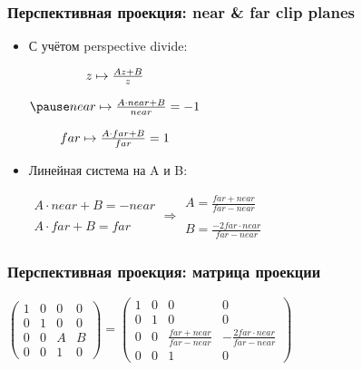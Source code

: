 \documentclass[10pt]{beamer}
\begin{document}
\begin{frame}[fragile]
\frametitle{Перспективная проекция: near \& far clip planes}
\begin{itemize}
\item С учётом perspective divide:
\begin{center}
\begin{math}
\begin{matrix}
z \mapsto \frac{Az + B}{z} \\ \\
\pause
near \mapsto \frac{A\cdot near + B}{near} = -1 \\ \\
far \mapsto \frac{A\cdot far + B}{far} = 1
\end{matrix}
\end{math}
\end{center}
\pause
\item Линейная система на A и B:
\begin{center}
\begin{math}
\begin{matrix}
A \cdot near + B = -near \\ \\
A \cdot far + B = far
\end{matrix}
\Rightarrow
\begin{matrix}
A = \frac{far + near}{far - near} \\ \\
B = \frac{-2 far \cdot near}{far - near}
\end{matrix}
\end{math}
\end{center}
\end{itemize}
\end{frame}

\begin{frame}[fragile]
\frametitle{Перспективная проекция: матрица проекции}
\begin{center}
\begin{math}
\begin{pmatrix}
1 & 0 & 0 & 0 \\
0 & 1 & 0 & 0 \\
0 & 0 & A & B \\
0 & 0 & 1 & 0
\end{pmatrix}
=
\begin{pmatrix}
1 & 0 & 0 & 0 \\
0 & 1 & 0 & 0 \\
0 & 0 & \frac{far + near}{far - near} & -\frac{2 far \cdot near}{far - near} \\
0 & 0 & 1 & 0
\end{pmatrix}
\end{math}
\end{center}
\end{frame}
\end{document}
